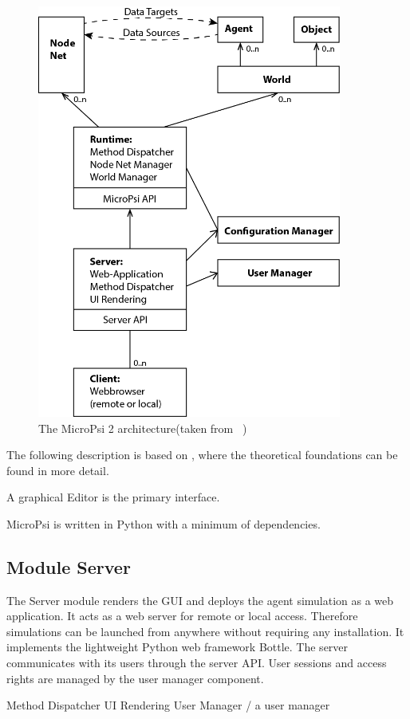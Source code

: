 \begin{figure}[h]
  \centering
    \includegraphics[width=10cm]{graphics/micropsi2_uml}
  \caption{The MicroPsi 2 architecture(taken from ~\cite{conf/agi/Bach12})}
  \label{micropsi2_modules}
\end{figure}

The following description is based on \cite{conf/agi/Bach12}, where the theoretical foundations can be found in more detail.

A graphical Editor is the primary interface.

MicroPsi is written in Python with a minimum of dependencies.

        \subsection{Module Server}
The Server module renders the GUI and deploys the agent simulation as a web application. It acts as a web server for remote or local access. Therefore simulations can be launched from anywhere without requiring any installation. It implements the lightweight Python web framework Bottle. The server communicates with its users through the server API. User sessions and access rights are managed by the user manager component. 
    
    Method Dispatcher
    UI Rendering
    User Manager / a user manager
    
